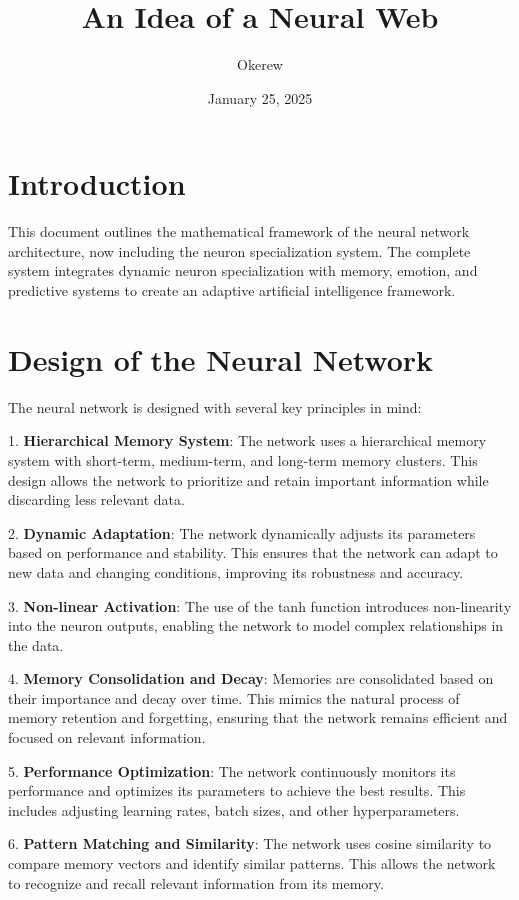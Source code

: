 \documentclass{article}
\title{An Idea of a Neural Web}
\author{Okerew}
\date{January 25, 2025}
\begin{document}
\maketitle

\section{Introduction}
This document outlines the mathematical framework of the neural network architecture, now including the neuron specialization system. The complete system integrates dynamic neuron specialization with memory, emotion, and predictive systems to create an adaptive artificial intelligence framework.

\section{Design of the Neural Network}
The neural network is designed with several key principles in mind:

1. \textbf{Hierarchical Memory System}: The network uses a hierarchical memory system with short-term, medium-term, and long-term memory clusters. This design allows the network to prioritize and retain important information while discarding less relevant data.

2. \textbf{Dynamic Adaptation}: The network dynamically adjusts its parameters based on performance and stability. This ensures that the network can adapt to new data and changing conditions, improving its robustness and accuracy.

3. \textbf{Non-linear Activation}: The use of the tanh function introduces non-linearity into the neuron outputs, enabling the network to model complex relationships in the data.

4. \textbf{Memory Consolidation and Decay}: Memories are consolidated based on their importance and decay over time. This mimics the natural process of memory retention and forgetting, ensuring that the network remains efficient and focused on relevant information.

5. \textbf{Performance Optimization}: The network continuously monitors its performance and optimizes its parameters to achieve the best results. This includes adjusting learning rates, batch sizes, and other hyperparameters.

6. \textbf{Pattern Matching and Similarity}: The network uses cosine similarity to compare memory vectors and identify similar patterns. This allows the network to recognize and recall relevant information from its memory.
\end{document}

